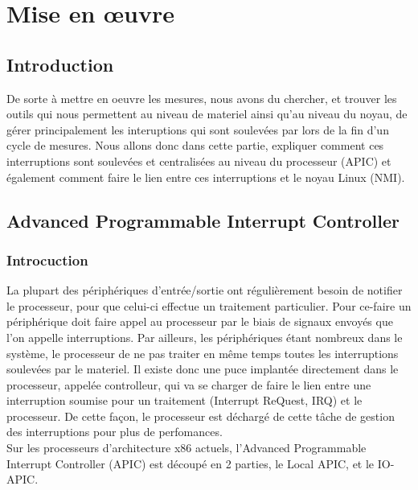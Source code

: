 			\section{Mise en \oe uvre}
				\subsection{Introduction}
					De sorte à mettre en oeuvre les mesures, nous avons du chercher, et trouver les outils qui nous permettent au niveau de materiel ainsi qu'au niveau du noyau, de gérer principalement les interuptions qui sont soulevées par \IBS lors de la fin d'un cycle de mesures. Nous allons donc dans cette partie, expliquer comment ces interruptions sont soulevées et centralisées au niveau du processeur (APIC) et également comment faire le lien entre ces interruptions et le noyau Linux (NMI).
				\subsection{Advanced Programmable Interrupt Controller}
					\subsubsection{Introcuction}
						La plupart des périphériques d'entrée/sortie ont régulièrement besoin de notifier le processeur, pour que celui-ci effectue un traitement particulier. Pour ce-faire un périphérique doit faire appel au processeur par le biais de signaux envoyés que l'on appelle interruptions. Par ailleurs, les périphériques étant nombreux dans le système, le processeur de ne pas traiter en même temps toutes les interruptions soulevées par le materiel. Il existe donc une puce implantée directement dans le processeur, appelée controlleur, qui va se charger de faire le lien entre une interruption soumise pour un traitement (Interrupt ReQuest, IRQ) et le processeur. De cette façon, le processeur est déchargé de cette tâche de gestion des interruptions pour plus de perfomances.\\ 
					Sur les processeurs d'architecture x86 actuels, l'Advanced Programmable Interrupt Controller (APIC) est découpé en 2 parties, le Local APIC, et le IO-APIC. 

